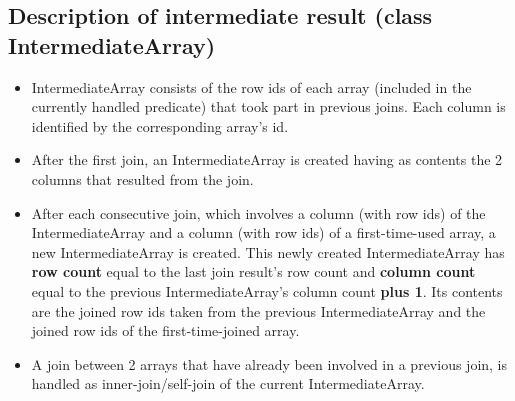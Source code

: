 \documentclass{ws-ijprai}
\begin{document}
\subsection{Description of intermediate result (class IntermediateArray)}
\begin{itemize}
    \item IntermediateArray consists of the row ids of each array (included in the currently handled predicate) that took part in previous joins. Each column is identified by the corresponding array’s id.
    \item After the first join, an IntermediateArray is created having as contents the 2 columns that resulted from the join.
    \item After each consecutive join, which involves a column (with row ids) of the IntermediateArray and a column (with row ids) of a first-time-used array, a new IntermediateArray is created. This newly created IntermediateArray has \textbf{row count} equal to the last join result’s row count and \textbf{column count} equal to the previous IntermediateArray’s column count \textbf{plus 1}. Its contents are the joined row ids taken from the previous IntermediateArray and the joined row ids of the first-time-joined array.
    \item A join between 2 arrays that have already been involved in a previous join, is handled as inner-join/self-join of the current IntermediateArray.

\end{itemize}
\end{document}
